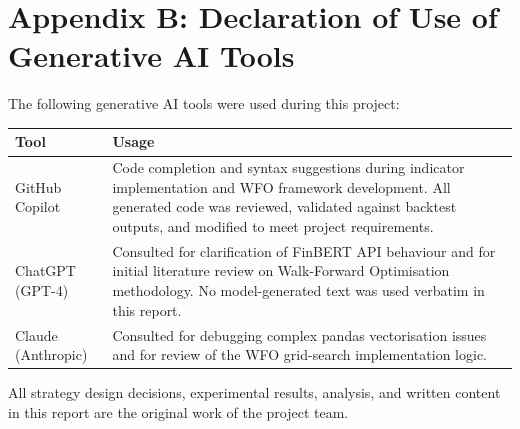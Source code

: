 \documentclass[11pt,twoside,a4paper]{article}
\begin{document}
\section*{Appendix B: Declaration of Use of Generative AI Tools}

The following generative AI tools were used during this project:

{\small
\begin{tabular}{>{\raggedright\arraybackslash}p{3.8cm}%
                >{\raggedright\arraybackslash}p{10.5cm}}
\hline
Tool & Usage \\
\hline
GitHub Copilot & Code completion and syntax suggestions during indicator implementation and WFO framework development. All generated code was reviewed, validated against backtest outputs, and modified to meet project requirements. \\[4pt]
ChatGPT (GPT-4) & Consulted for clarification of FinBERT API behaviour and for initial literature review on Walk-Forward Optimisation methodology. No model-generated text was used verbatim in this report. \\[4pt]
Claude (Anthropic) & Consulted for debugging complex pandas vectorisation issues and for review of the WFO grid-search implementation logic. \\
\hline
\end{tabular}
}

All strategy design decisions, experimental results, analysis, and written content in this report are the original work of the project team.
\end{document}
